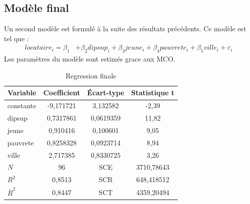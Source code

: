 \documentclass{article}
\begin{document}
\subsection{Modèle final}
Un second modèle est formulé à la suite des résultats précédents. Ce modèle est tel que :
\begin{equation*}
    \begin{split}
            locataire_i =  \beta_1 &+ \beta_2dipsup_i + \beta_3jeune_i + \beta_4pauvrete_i + \beta_5ville_i+\varepsilon_i 
    \end{split}
\end{equation*}
Les paramètres du modèle sont estimés grace aux MCO.
\begin{table}[H]
\centering
\caption{Regression finale}
\label{table:secondeReg}
\begin{tabular}{l*{1}{ccc}}
\toprule
Variable            & Coefficient&  Écart-type&Statistique t\\
\midrule
constante      &   -9,171721&    3,132582&   -2,39\\
dipsup&    0,7317861 &    0,0619359&    11,82\\
jeune  &     0,910416 &    0,100601&    9,05\\
pauvrete&    0,8258328 &     0,0923714 &   8,94\\
ville &   2,717385 &  0,8330725   &  3,26 \\
\midrule
$N$       &          96& SCE & 3710,78643           \\
$R^{2}$ & 0,8513 &       SCR & 648,418512   \\ 
$\bar{R}^2$ & 0,8447 &   SCT & 4359,20494 \\ 
\bottomrule
\end{tabular}
\end{table}
\end{document}

